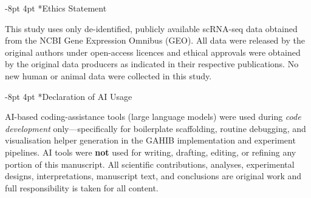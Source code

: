 \documentclass[preprint,12pt]{elsarticle}
\makeatletter
\renewcommand\section{\@startsection{section}{1}{\z@}%
  {-8pt \@plus -2pt \@minus -2pt}%
  {4pt \@plus 1pt \@minus 1pt}%
  {\normalfont\Large\bfseries}}
\makeatother
\begin{document}


\section*{Ethics Statement}

This study uses only de-identified, publicly available scRNA-seq data
obtained from the NCBI Gene Expression Omnibus (GEO).
All data were released by the original authors under open-access
licences and ethical approvals were obtained by the original data
producers as indicated in their respective publications.
No new human or animal data were collected in this study.


\section*{Declaration of AI Usage}

AI-based coding-assistance tools (large language models) were used
during \emph{code development} only---specifically for boilerplate
scaffolding, routine debugging, and visualisation helper generation
in the GAHIB implementation and experiment pipelines.
AI tools were \textbf{not} used for writing, drafting, editing, or
refining any portion of this manuscript.
All scientific contributions, analyses, experimental designs,
interpretations, manuscript text, and conclusions are original work
and full responsibility is taken for all content.
\end{document}
